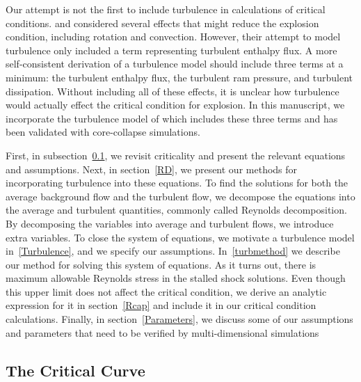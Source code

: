 \documentclass[twocolumn]{aastex6}
\begin{document}
Our attempt is not the first to include turbulence in
  calculations of critical conditions.  \citet{yamasaki05} and
\citet{yamasaki06} considered several effects that might
  reduce the explosion condition, including rotation and convection.
  However, their attempt to model turbulence only included a term representing
  turbulent enthalpy flux.  A more self-consistent derivation of a
  turbulence model should include three terms at a minimum: the
  turbulent enthalpy flux, the turbulent ram pressure, and turbulent
  dissipation. Without including all of these effects, it is unclear how turbulence
would actually effect the critical condition for explosion.  In this
manuscript, we incorporate the turbulence model of \citet{murphy13}
which includes these three terms and has been validated with
  core-collapse simulations. 

First, in subsection~\ref{critcurve}, we revisit criticality and present the relevant equations and
  assumptions. Next, in section~\ref{RD}, we present our methods for incorporating
  turbulence into these equations. To
  find the solutions for both the average background flow and the
  turbulent flow, we decompose the equations into the average and turbulent quantities, commonly called Reynolds decomposition.  By decomposing the
    variables into average and turbulent flows, we introduce extra
    variables.  To close the system of equations, we motivate a
    turbulence model in~\ref{Turbulence}, and we specify our
    assumptions. In~\ref{turbmethod} we describe our method for
    solving this system of equations. As it turns out, there
      is maximum allowable Reynolds stress in the stalled shock
      solutions.  Even though this upper limit does not affect the
      critical condition, we derive an analytic expression for it in
      section~\ref{Rcap} and include it in our critical condition
      calculations. Finally, in section~\ref{Parameters}, we discuss
    some of our assumptions and parameters
    that need to be verified by multi-dimensional
      simulations

\subsection{The Critical Curve}
\label{critcurve}
\end{document}
